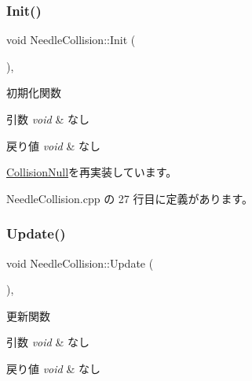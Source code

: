 \subsubsection{\texorpdfstring{Init()}{Init()}}
{\footnotesize\ttfamily void Needle\+Collision\+::\+Init (\begin{DoxyParamCaption}{ }\end{DoxyParamCaption})\hspace{0.3cm}{\ttfamily [override]}, {\ttfamily [virtual]}}



初期化関数 


\begin{DoxyParams}{引数}
{\em void} & なし \\
\hline
\end{DoxyParams}

\begin{DoxyRetVals}{戻り値}
{\em void} & なし \\
\hline
\end{DoxyRetVals}


\mbox{\hyperlink{class_collision_null_a18cfc21fefcd3e8dec380ac44a85f111}{Collision\+Null}}を再実装しています。



 Needle\+Collision.\+cpp の 27 行目に定義があります。

\mbox{\label{class_needle_collision_a9226bcc45aa952abcafa56c7af8c8627}} 
\subsubsection{\texorpdfstring{Update()}{Update()}}
{\footnotesize\ttfamily void Needle\+Collision\+::\+Update (\begin{DoxyParamCaption}{ }\end{DoxyParamCaption})\hspace{0.3cm}{\ttfamily [override]}, {\ttfamily [virtual]}}



更新関数 


\begin{DoxyParams}{引数}
{\em void} & なし \\
\hline
\end{DoxyParams}

\begin{DoxyRetVals}{戻り値}
{\em void} & なし \\
\hline
\end{DoxyRetVals}


